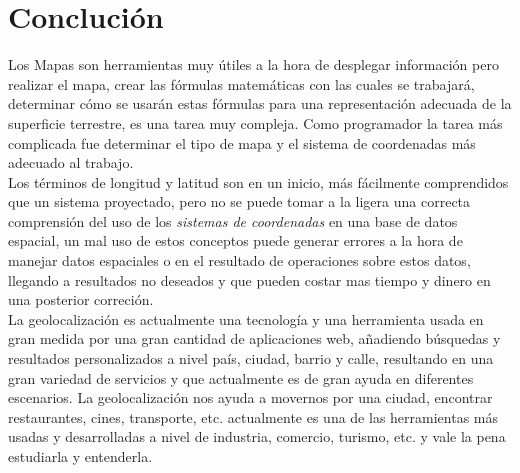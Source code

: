   \section{Concluci\'on} %
  \label{sec:geo_conclucion}
    Los Mapas son herramientas muy útiles a la hora de desplegar información pero realizar el mapa, crear las fórmulas matemáticas con las cuales se trabajará, determinar cómo se usarán estas fórmulas para una representación adecuada de la superficie terrestre, es una tarea muy compleja. Como programador la tarea más complicada fue determinar el tipo de mapa y el sistema de coordenadas más adecuado al trabajo.\\

    Los términos de longitud y latitud son en un inicio, más fácilmente comprendidos que un sistema proyectado, pero no se puede tomar a la ligera una correcta comprensión del uso de los \emph{sistemas de coordenadas} en una base de datos espacial, un mal uso de estos conceptos puede generar errores a la hora de manejar datos  espaciales o en el resultado de operaciones sobre estos  datos, llegando a resultados no deseados y que pueden costar mas tiempo y dinero en una posterior correci\'on.\\

    La geolocalizaci\'on es actualmente una tecnolog\'ia y una herramienta usada en gran medida por una gran cantidad de aplicaciones web, a\~nadiendo b\'usquedas y resultados personalizados a nivel pa\'is, ciudad, barrio y calle, resultando en una gran variedad de servicios y que actualmente es de gran ayuda en diferentes escenarios. La geolocalizaci\'on nos ayuda a movernos por una ciudad, encontrar restaurantes, cines, transporte, etc. actualmente es una de las herramientas m\'as usadas y desarrolladas a nivel de industria, comercio, turismo, etc. y vale la pena estudiarla y entenderla.\\





